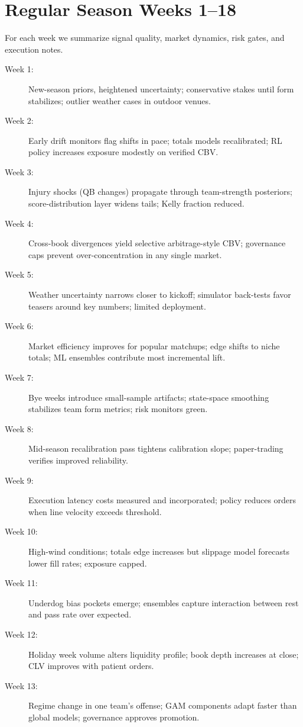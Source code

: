 \documentclass[12pt]{report}  %
\numberwithin{equation}{section}
\theoremstyle{plain}
\theoremstyle{definition}
\theoremstyle{remark}
\begin{document}
\section{Regular Season Weeks 1--18}
For each week we summarize signal quality, market dynamics, risk gates, and execution notes.
\begin{description}
  \item[Week 1:] New-season priors, heightened uncertainty; conservative stakes until form stabilizes; outlier weather cases in outdoor venues.
  \item[Week 2:] Early drift monitors flag shifts in pace; totals models recalibrated; RL policy increases exposure modestly on verified CBV.
  \item[Week 3:] Injury shocks (QB changes) propagate through team-strength posteriors; score-distribution layer widens tails; Kelly fraction reduced.
  \item[Week 4:] Cross-book divergences yield selective arbitrage-style CBV; governance caps prevent over-concentration in any single market.
  \item[Week 5:] Weather uncertainty narrows closer to kickoff; simulator back-tests favor teasers around key numbers; limited deployment.
  \item[Week 6:] Market efficiency improves for popular matchups; edge shifts to niche totals; ML ensembles contribute most incremental lift.
  \item[Week 7:] Bye weeks introduce small-sample artifacts; state-space smoothing stabilizes team form metrics; risk monitors green.
  \item[Week 8:] Mid-season recalibration pass tightens calibration slope; paper-trading verifies improved reliability.
  \item[Week 9:] Execution latency costs measured and incorporated; policy reduces orders when line velocity exceeds threshold.
  \item[Week 10:] High-wind conditions; totals edge increases but slippage model forecasts lower fill rates; exposure capped.
  \item[Week 11:] Underdog bias pockets emerge; ensembles capture interaction between rest and pass rate over expected.
  \item[Week 12:] Holiday week volume alters liquidity profile; book depth increases at close; CLV improves with patient orders.
  \item[Week 13:] Regime change in one team’s offense; GAM components adapt faster than global models; governance approves promotion.

\end{description}
\end{document}
